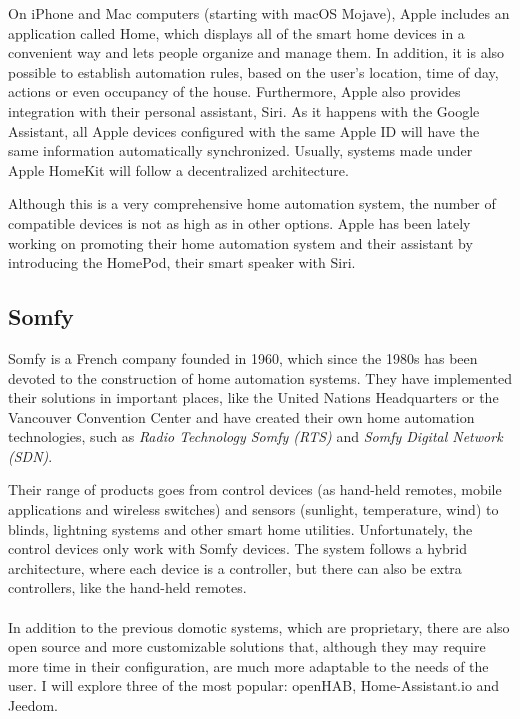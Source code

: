 On iPhone and Mac computers (starting with macOS Mojave), Apple includes an application called Home, which displays all 
of the smart home devices in a convenient way and lets people organize and manage them. In addition, it is also possible to establish 
automation rules, based on the user's location, time of day, actions or even occupancy of the house. Furthermore, Apple also provides
integration with their personal assistant, Siri. As it happens with the Google Assistant, all Apple devices configured with the same Apple 
ID will have the same information automatically synchronized.\cite{appleIOSHome} Usually, systems made under Apple HomeKit will follow
a decentralized architecture.

Although this is a very comprehensive home automation system, the number of compatible devices is not as high as in other options. 
Apple has been lately working on promoting their home automation system and their assistant by introducing the HomePod, their smart
speaker with Siri.

\subsection{Somfy}
Somfy is a French company founded in 1960, which since the 1980s has been devoted to the construction of home automation systems.
They have implemented their solutions in important places, like the United Nations Headquarters or the Vancouver Convention Center 
and have created their own home automation technologies, such as \textit{Radio Technology Somfy (RTS)} and \textit{Somfy Digital 
Network (SDN)}.\cite{somfyOurStory}

Their range of products goes from control devices (as hand-held remotes, mobile applications and wireless switches) and sensors (sunlight,
temperature, wind) to blinds, lightning systems and other smart home utilities. Unfortunately, the control devices only work with Somfy 
devices. The system follows a hybrid architecture, where each device is a controller, but there can also be extra controllers, like the 
hand-held remotes.
\\~\\

In addition to the previous domotic systems, which are proprietary, there are also open source and more customizable solutions that, 
although they may require more time in their configuration, are much more adaptable to the needs of the user. I will explore three of
the most popular: openHAB, Home-Assistant.io and Jeedom.

